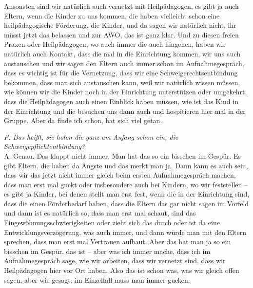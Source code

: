 \begin{linenumbers*}
Ansonsten sind wir natürlich auch vernetzt mit Heilpädagogen, es gibt ja auch Eltern, wenn die Kinder zu uns kommen, die haben vielleicht schon eine heilpädagogische Förderung, die Kinder, und da sagen wir natürlich nicht, ihr müsst jetzt das belassen und zur AWO, das ist ganz klar. Und zu diesen freien Praxen oder Heilpädagogen, wo auch immer die auch hingehen, haben wir natürlich auch Kontakt, dass die mal in die Einrichtung kommen, wir uns auch austauschen 
und wir sagen den Eltern auch immer schon im Aufnahmegespräch, dass es wichtig ist für die Vernetzung, dass wir eine Schweigerechtsentbindung bekommen, dass man sich austauschen kann, weil wir natürlich wissen müssen, wie können wir die Kinder noch in der Einrichtung unterstützen oder umgekehrt, dass die Heilpädagogen auch einen Einblick haben müssen, wie ist das Kind in der Einrichtung und die besuchen uns dann auch und hospitieren hier mal in der Gruppe. Aber da finde ich schon, hat sich viel getan. 

\emph{F: Das heißt, sie holen die ganz am Anfang schon ein, die Schweigepflichtentbindung?}\\
A: Genau. Das klappt nicht immer. Man hat das so ein bisschen im Gespür. Es gibt Eltern, die haben da Ängste und das merkt man ja. Dann kann es auch sein, dass wir das jetzt nicht immer gleich beim ersten Aufnahmegespräch machen, dass man erst mal guckt oder insbesondere auch bei Kindern, wo wir feststellen -- es gibt ja Kinder, bei denen stellt man erst fest, wenn die in der Einrichtung sind, dass die einen Förderbedarf haben, dass die Eltern das gar nicht sagen im Vorfeld und dann ist es natürlich so, dass man erst mal schaut, sind das Eingewöhnungsschwierigkeiten oder zieht sich das durch oder ist da eine Entwicklungsverzögerung, was auch immer, und dann würde man mit den Eltern sprechen, dass man erst mal Vertrauen aufbaut. Aber das hat man ja so ein bisschen im Gespür, das ist -- aber was ich immer mache, dass ich im Aufnahmegespräch sage, wie wir arbeiten, dass wir vernetzt sind, dass wir Heilpädagogen hier vor Ort haben. Also das ist schon was, was wir gleich offen sagen, aber wie gesagt, im Einzelfall muss man immer gucken. 
      

\end{linenumbers*}
